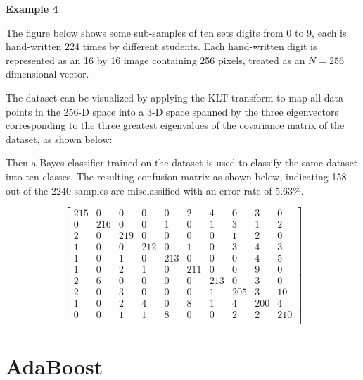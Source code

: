 \documentclass{article}
\begin{document}

{\bf Example 4}

The figure below shows some sub-samples of ten sets digits from 0 to 9, 
each is hand-written 224 times by different students. Each hand-written
digit is represented as an 16 by 16 image containing 256 pixels, treated
as an $N=256$ dimensional vector. 


The dataset can be visualized by applying the KLT transform to map all
data points in the 256-D space into a 3-D space spanned by the three 
eigenvectors corresponding to the three greatest eigenvalues of the 
covariance matrix of the dataset, as shown below:


Then a Bayes classifier trained on the dataset is used to classify the 
same dataset into ten classes. The resulting confusion matrix as shown 
below, indicating 158 out of the 2240 samples are misclassified with an
error rate of 5.63\%.

\begin{equation}
\left[ \begin{array}{rrrrrrrrrr}
   215 &   0 &   0 &   0 &   0 &   2 &   4 &   0 &   3  &  0 \\
     0 & 216 &   0 &   0 &   1 &   0 &   1 &   3 &   1  &  2 \\
     2 &   0 & 219 &   0 &   0 &   0 &   0 &   1 &   2  &  0 \\
     1 &   0 &   0 & 212 &   0 &   1 &   0 &   3 &   4  &  3 \\
     1 &   0 &   1 &   0 & 213 &   0 &   0 &   0 &   4  &  5 \\
     1 &   0 &   2 &   1 &   0 & 211 &   0 &   0 &   9  &  0 \\
     2 &   6 &   0 &   0 &   0 &   0 & 213 &   0 &   3  &  0 \\
     2 &   0 &   3 &   0 &   0 &   0 &   1 & 205 &   3  & 10 \\
     1 &   0 &   2 &   4 &   0 &   8 &   1 &   4 & 200  &  4 \\
     0 &   0 &   1 &   1 &   8 &   0 &   0 &   2 &   2  &210 \\
\end{array} \right]
\end{equation}

\section{AdaBoost}
\end{document}
